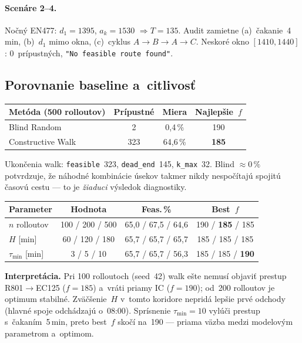 \documentclass[11pt,a4paper]{article}
\begin{document}
\paragraph{Scenáre 2--4.}
Nočný EN477: $d_1=1395$, $a_k=1530$ $\Rightarrow T=135$.
Audit zamietne (a)~čakanie~4\,min, (b)~$d_1$ mimo okna, (c)~cyklus
$A\to B\to A\to C$. Neskoré okno $[1410,1440]$: 0~prípustných,
\texttt{"No feasible route found"}.

\subsection{Porovnanie baseline a~citlivosť}

\begin{center}
\small
\begin{tabular}{@{}lccc@{}}
\toprule
Metóda (500 rolloutov) & Prípustné & Miera & Najlepšie~$f$ \\
\midrule
Blind Random & 2 & 0{,}4\,\% & 190 \\
Constructive Walk & 323 & 64{,}6\,\% & \textbf{185} \\
\bottomrule
\end{tabular}
\end{center}

Ukončenia walk: \texttt{feasible}~323, \texttt{dead\_end}~145,
\texttt{k\_max}~32. Blind $\approx 0\,\%$ potvrdzuje, že náhodné
kombinácie úsekov takmer nikdy nespočítajú spojitú časovú cestu ---
to je \emph{žiaduci} výsledok diagnostiky.

\begin{center}
\small
\begin{tabular}{@{}lccc@{}}
\toprule
Parameter & Hodnota & Feas.\,\% & Best~$f$ \\
\midrule
$n$ rolloutov & 100 / 200 / 500 & 65{,}0 / 67{,}5 / 64{,}6 & 190 / \textbf{185} / 185 \\
$H$ [min] & 60 / 120 / 180 & 65{,}7 / 65{,}7 / 65{,}7 & 185 / 185 / 185 \\
$\tau_{\min}$ [min] & 3 / 5 / 10 & 65{,}7 / 65{,}7 / 56{,}3 & 185 / 185 / \textbf{190} \\
\bottomrule
\end{tabular}
\end{center}

\textbf{Interpretácia.} Pri 100 rolloutoch (seed~42) walk ešte nemusí
objaviť prestup R801$\to$EC125 ($f=185$) a~vráti priamy IC ($f=190$);
od~200 rolloutov je optimum stabilné. Zväčšenie~$H$ v~tomto koridore
nepridá lepšie prvé odchody (hlavné spoje odchádzajú o~08{:}00).
Sprísnenie $\tau_{\min}=10$ vylúči prestup s~čakaním~5\,min, preto
best~$f$ skočí na~190 --- priama väzba medzi modelovým parametrom
a~optimom.
\end{document}

